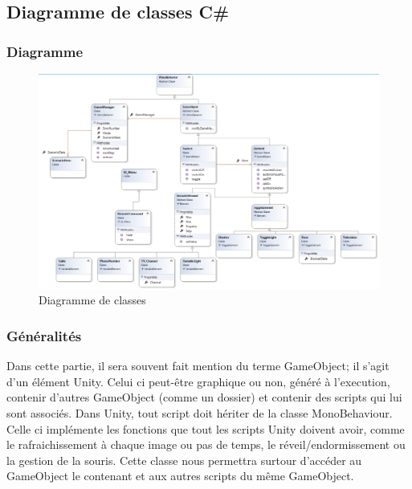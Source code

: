 \subsection{Diagramme de classes C\#}

\subsubsection{Diagramme}
\begin{figure}[h]
    \centering
    \includegraphics[width=\textwidth]{4-Conception/img/diagClasses.png}
    \caption{Diagramme de classes}
    \label{fig:class_diagram}
\end{figure}

\subsubsection{Généralités}
Dans cette partie, il sera souvent fait mention du terme GameObject; il s'agit d'un élément Unity. 
Celui ci peut-être graphique ou non, généré à l'execution, contenir d'autres GameObject (comme un dossier) et contenir des scripts qui lui sont associés.
\newline
Dans Unity, tout script doit hériter de la classe MonoBehaviour.
Celle ci implémente les fonctions que tout les scripts Unity doivent avoir, comme le rafraichissement à chaque image ou pas de temps, le réveil/endormissement ou la gestion de la souris.
Cette classe nous permettra surtour d'accéder au GameObject le contenant et aux autres scripts du même GameObject.

